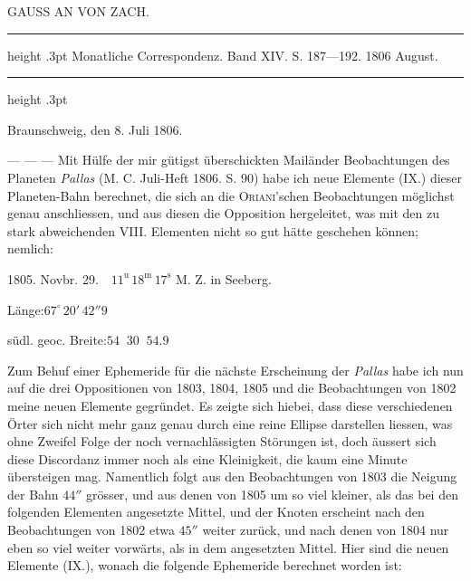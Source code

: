 \par\bigskip
{}
\begin{center}
\large GAUSS AN VON ZACH.
\end{center}

\begin{center}
\parbox{.75\linewidth}{%
\centering\fontsize{8.2}{10.2}\selectfont
\hrule height .3pt\relax\vspace{2.5pt}
Monatliche Correspondenz. Band XIV. S. 187—192. 1806 August.\par
\vspace{2.5pt}\hrule height .3pt\relax
}
\end{center}

\begin{flushright}
Braunschweig, den 8. Juli 1806.
\end{flushright}

\par\indent --- --- --- Mit Hülfe der mir gütigst überschickten Mailänder Beobachtungen des Planeten
\emph{Pallas} (M. C. Juli-Heft 1806. S. 90) habe ich neue Elemente (IX.) dieser Planeten-Bahn berechnet, die
sich an die \textsc{Oriani}'schen Beobachtungen möglichst genau anschliessen, und aus diesen die Opposition
hergeleitet, was mit den zu stark abweichenden VIII. Elementen nicht so gut hätte geschehen können;
nemlich:

\begin{center}
1805. Novbr. 29.\ \ $11^{\mathrm{u}}\,18^{\mathrm{m}}\,17^{\mathrm{s}}$ M. Z. in Seeberg.

Länge:\quad $67^\circ\,20'\,42''9$

südl. geoc. Breite:\quad $54\;\;30\;\;54.9$
\end{center}

\par\indent Zum Behuf einer Ephemeride für die nächste Erscheinung der \emph{Pallas} habe ich nun auf die drei
Oppositionen von 1803, 1804, 1805 und die Beobachtungen von 1802 meine neuen Elemente gegründet.
Es zeigte sich hiebei, dass diese verschiedenen Örter sich nicht mehr ganz genau durch eine reine Ellipse darstellen liessen, was ohne Zweifel Folge der noch vernachlässigten Störungen ist, doch äussert
sich diese Discordanz immer noch als eine Kleinigkeit, die kaum eine Minute übersteigen mag. Namentlich
folgt aus den Beobachtungen von 1803 die Neigung der Bahn $44''$ grösser, und aus denen von 1805 um
so viel kleiner, als das bei den folgenden Elementen angesetzte Mittel, und der Knoten erscheint nach
den Beobachtungen von 1802 etwa $45''$ weiter zurück, und nach denen von 1804 nur eben so viel weiter
vorwärts, als in dem angesetzten Mittel. Hier sind die neuen Elemente (IX.), wonach die folgende Ephemeride berechnet worden ist:


